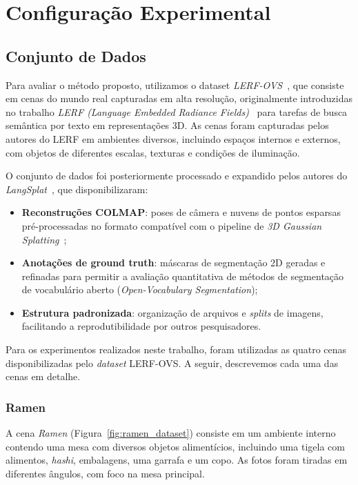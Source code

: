 \section{Configuração Experimental}
\subsection{Conjunto de Dados}
Para avaliar o método proposto, utilizamos o dataset \textit{LERF-OVS}~\cite{Qin_2024_CVPR}, que consiste em cenas do mundo real capturadas em alta resolução, originalmente introduzidas no trabalho \textit{LERF (Language Embedded Radiance Fields)}~\cite{kerr2023lerf} para tarefas de busca semântica por texto em representações 3D. As cenas foram capturadas pelos autores do LERF em ambientes diversos, incluindo espaços internos e externos, com objetos de diferentes escalas, texturas e condições de iluminação.

O conjunto de dados foi posteriormente processado e expandido pelos autores do \textit{LangSplat}~\cite{Qin_2024_CVPR}, que disponibilizaram:

\begin{itemize}
    \item \textbf{Reconstruções COLMAP}: poses de câmera e nuvens de pontos esparsas pré-processadas no formato compatível com o pipeline de \textit{3D Gaussian Splatting}~\cite{kerbl20233d};
    \item \textbf{Anotações de ground truth}: máscaras de segmentação 2D geradas e refinadas para permitir a avaliação quantitativa de métodos de segmentação de vocabulário aberto (\textit{Open-Vocabulary Segmentation});
    \item \textbf{Estrutura padronizada}: organização de arquivos e \textit{splits} de imagens, facilitando a reprodutibilidade por outros pesquisadores.
\end{itemize}

Para os experimentos realizados neste trabalho, foram utilizadas as quatro cenas disponibilizadas pelo \textit{dataset} LERF-OVS. A seguir, descrevemos cada uma das cenas em detalhe.

\subsubsection{Ramen}

A cena \textit{Ramen} (Figura~\ref{fig:ramen_dataset}) consiste em um ambiente interno contendo uma mesa com diversos objetos alimentícios, incluindo uma tigela com alimentos, \textit{hashi}, embalagens, uma garrafa e um copo. As fotos foram tiradas em diferentes ângulos, com foco na mesa principal.


